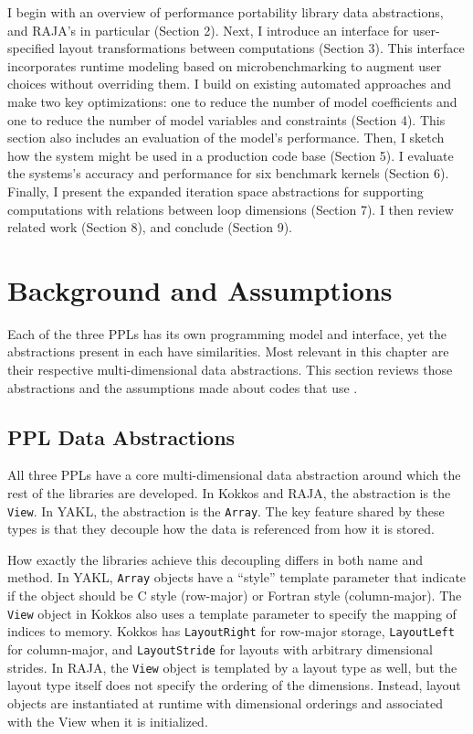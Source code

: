 I begin with an overview of performance portability library data abstractions, and RAJA's in particular (Section 2).
Next, I introduce an interface for user-specified layout transformations between computations (Section 3).
This interface incorporates runtime modeling based on microbenchmarking to augment user choices without overriding them.
I build on existing automated approaches and make two key optimizations: one to reduce the number of model coefficients and one to reduce the number of model variables and constraints (Section 4).
This section also includes an evaluation of the model's performance.
Then, I sketch how the \FormatDecisions{} system might be used in a production code base (Section 5).
I evaluate the systems's accuracy and performance for six benchmark kernels (Section 6).
Finally, I present the expanded iteration space abstractions for supporting computations with relations between loop dimensions (Section 7).
I then review related work (Section 8), and conclude (Section 9).


\section{Background and Assumptions}

Each of the three PPLs has its own programming model and interface, yet the abstractions present in each have similarities.
Most relevant in this chapter are their respective multi-dimensional data abstractions.
This section reviews those abstractions and the assumptions made about codes that use \FormatDecisions{}.

\subsection{PPL Data Abstractions}

All three PPLs have a core multi-dimensional data abstraction around which the rest of the libraries are developed.
In Kokkos and RAJA, the abstraction is the \verb.View..
In YAKL, the abstraction is the \verb.Array..
The key feature shared by these types is that they decouple how the data is referenced from how it is stored.

How exactly the libraries achieve this decoupling differs in both name and method.
In YAKL, \verb.Array. objects have a ``style'' template parameter that indicate if the object should be C style (row-major) or Fortran style (column-major). 
The \verb.View. object in Kokkos also uses a template parameter to specify the mapping of indices to memory.
Kokkos has \verb.LayoutRight. for row-major storage, \verb.LayoutLeft. for column-major, and \verb.LayoutStride. for layouts with arbitrary dimensional strides.
In RAJA, the \verb.View. object is templated by a layout type as well, but the layout type itself does not specify the ordering of the dimensions. 
Instead, layout objects are instantiated at runtime with dimensional orderings and associated with the View when it is initialized.


